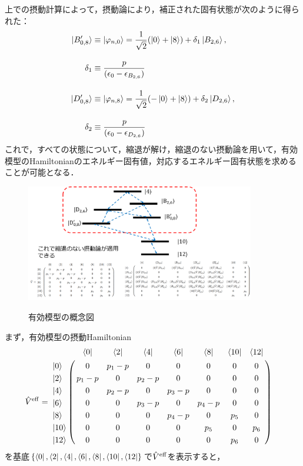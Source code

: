 上での摂動計算によって，摂動論により，補正された固有状態が次のように得られた：
\begin{align}
    \ket{B_{0,8}^{\prime}}
    &\equiv\ket{\varphi_{n,0}}
     = \frac{1}{\sqrt{2}}(\ket{0}+\ket{8}) + \delta_1\ket{B_{2,6}},\\[10pt]
     \delta_1 &\equiv \frac{p}{(\epsilon_0-\epsilon_{B_{2,6}})}\\[10pt]
    \ket{D_{0,8}^{\prime}}
    &\equiv\ket{\varphi_{n,8}}
     = \frac{1}{\sqrt{2}}(-\ket{0}+\ket{8}) + \delta_2\ket{D_{2,6}},\\[10pt]
     \delta_2 &\equiv \frac{p}{(\epsilon_0-\epsilon_{D_{2,6}})}
\end{align}
これで，すべての状態について，縮退が解け，縮退のない摂動論を用いて，有効模型のHamiltonianのエネルギー固有値，対応するエネルギー固有状態を求めることが可能となる．
\begin{figure}[h]
\centering
		\includegraphics[width=10cm]{file/fig/effective_0and8/KPO_effective_0and8_6.png} \\
\caption{有効模型の概念図}
\label{fig:kpo_effective_0and8_6}
\end{figure}
まず，有効模型の摂動Hamiltonian
\begin{align}
  \hat{V}^{\rm{eff}}&=
   \bordermatrix{     
    & \bra{0} &  \bra{2} &  \bra{4}&  \bra{6}&  \bra{8} &\bra{10} &\bra{12}\cr
   \ket{0}&0&p_1-p&0&0&0&0&0\cr
  \ket{2}&p_1-p&0&p_2-p&0&0&0&0\cr
  \ket{4}&0&p_2-p&0&p_3-p&0&0&0\cr
  \ket{6}&0&0&p_3-p&0&p_4-p&0&0\cr
  \ket{8}&0&0&0&p_4-p&0&p_5&0\cr
  \ket{10}&0&0&0&0&p_5&0&p_6\cr
  \ket{12}&0&0&0&0&0&p_6&0\cr}
\end{align}
を基底$\{\bra{0},  \bra{2},  \bra{4}, \bra{6},  \bra{8}, \bra{10}, \bra{12}\}$で$\hat{V}^{\rm{eff}}$を表示すると，
